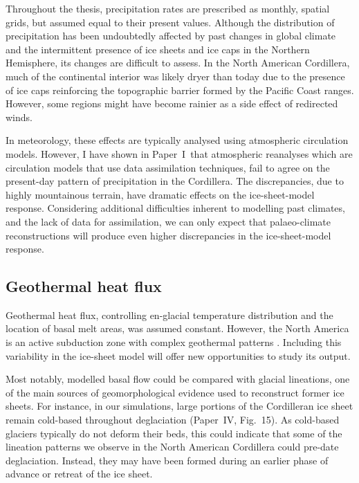 \documentclass{article}
\newcommand{\CCLI}[0]{Paper~I}      %
\newcommand{\CCYC}[0]{Paper~IV}     %
\begin{document}
Throughout the thesis, precipitation rates are prescribed as monthly, spatial
grids, but assumed equal to their present values. Although the distribution of
precipitation has been undoubtedly affected by past changes in global climate
and the intermittent presence of ice sheets and ice caps in the Northern
Hemisphere, its changes are difficult to assess. In the North American
Cordillera, much of the continental interior was likely dryer than today due to
the presence of ice caps reinforcing the topographic barrier formed by the
Pacific Coast ranges. However, some regions might have become rainier as a side
effect of redirected winds.

In meteorology, these effects are typically analysed using atmospheric
circulation models. However, I have shown in \CCLI\ that atmospheric reanalyses
which are circulation models that use data assimilation techniques, fail to
agree on the present-day pattern of precipitation in the Cordillera. The
discrepancies, due to highly mountainous terrain, have dramatic effects on the
ice-sheet-model response. Considering additional difficulties inherent to
modelling past climates, and the lack of data for assimilation, we can only
expect that palaeo-climate reconstructions will produce even higher
discrepancies in the ice-sheet-model response.


\subsection{Geothermal heat flux}

Geothermal heat flux, controlling en-glacial temperature distribution and the
location of basal melt areas, was assumed constant. However, the North America
is an active subduction zone with complex geothermal patterns
\citep{Blackwell.Richards.2004}. Including this variability in the ice-sheet
model will offer new opportunities to study its output.

Most notably, modelled basal flow could be compared with glacial lineations,
one of the main sources of geomorphological evidence used to reconstruct former
ice sheets. For instance, in our simulations, large portions of the Cordilleran
ice sheet remain cold-based throughout deglaciation (\CCYC, Fig.~15). As
cold-based glaciers typically do not deform their beds, this could indicate
that some of the lineation patterns we observe in the North American Cordillera
could pre-date deglaciation. Instead, they may have been formed during an
earlier phase of advance or retreat of the ice sheet.
\end{document}
